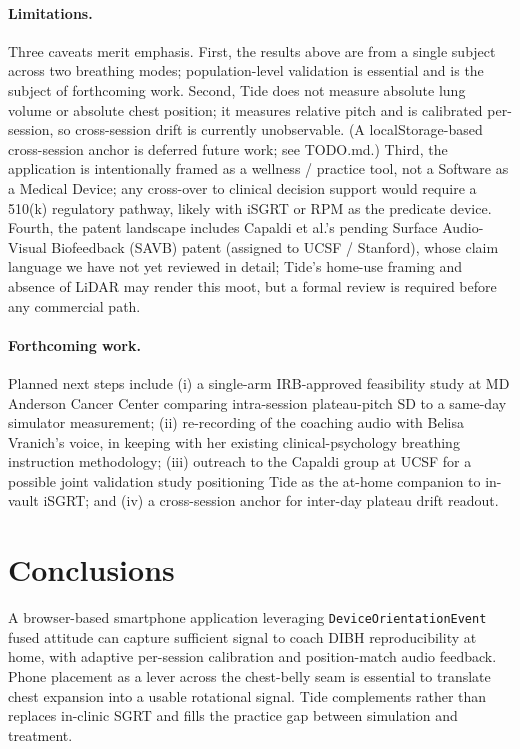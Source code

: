 \documentclass[3p,times]{elsarticle}
\begin{document}
\paragraph{Limitations.} Three caveats merit emphasis. First, the
results above are from a single subject across two breathing
modes; population-level validation is essential and is the subject
of forthcoming work. Second, Tide does not measure absolute lung
volume or absolute chest position; it measures relative pitch and
is calibrated per-session, so cross-session drift is currently
unobservable. (A localStorage-based cross-session anchor is
deferred future work; see TODO.md.) Third, the application is
intentionally framed as a wellness / practice tool, not a Software
as a Medical Device; any cross-over to clinical decision support
would require a 510(k) regulatory pathway, likely with iSGRT or
RPM as the predicate device. Fourth, the patent landscape includes
Capaldi et al.'s pending Surface Audio-Visual Biofeedback (SAVB)
patent (assigned to UCSF / Stanford), whose claim language we have
not yet reviewed in detail; Tide's home-use framing and absence of
LiDAR may render this moot, but a formal review is required before
any commercial path.

\paragraph{Forthcoming work.}
Planned next steps include (i) a single-arm IRB-approved feasibility
study at MD Anderson Cancer Center comparing intra-session
plateau-pitch SD to a same-day simulator measurement; (ii)
re-recording of the coaching audio with Belisa Vranich's voice, in
keeping with her existing clinical-psychology breathing
instruction methodology; (iii) outreach to the Capaldi group at
UCSF for a possible joint validation study positioning Tide as
the at-home companion to in-vault iSGRT; and (iv) a
cross-session anchor for inter-day plateau drift readout.

\section{Conclusions}

A browser-based smartphone application leveraging
\texttt{DeviceOrientationEvent} fused attitude can capture
sufficient signal to coach DIBH reproducibility at home, with
adaptive per-session calibration and position-match audio
feedback. Phone placement as a lever across the chest-belly seam
is essential to translate chest expansion into a usable rotational
signal. Tide complements rather than replaces in-clinic SGRT and
fills the practice gap between simulation and treatment.
\end{document}
